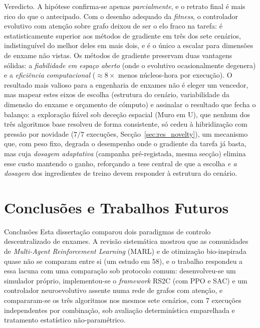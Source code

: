 \documentclass[12pt,reqno, twoside]{amsbook}
\makeatletter
\def\section{\@startsection{section}{1}%
      \z@{.5\linespacing\@plus.7\linespacing}{.25\linespacing}%
      {\normalfont\bfseries\flushleft}}
\def\paragraph{\@startsection{paragraph}{4}%
  \z@\z@{-\fontdimen2\font}%
  {\normalfont\bfseries}}
\theoremstyle{plain}
\numberwithin{equation}{chapter}
\numberwithin{section}{chapter}
\numberwithin{table}{chapter}
\numberwithin{figure}{chapter}
\makeatother
\begin{document}
\paragraph{Veredicto.} A hipótese confirma-se apenas \emph{parcialmente}, e o retrato final é mais rico do que o antecipado. Com o desenho adequado da \textit{fitness}, o controlador evolutivo com atenção sobre grafo deixou de ser o elo fraco na tarefa: é estatisticamente superior aos métodos de gradiente em três dos sete cenários, indistinguível do melhor deles em mais dois, e é o único a escalar para dimensões de enxame não vistas. Os métodos de gradiente preservam duas vantagens sólidas: a \emph{fiabilidade em espaço aberto} (onde o evolutivo ocasionalmente degenera) e a \emph{eficiência computacional} ($\approx 8\times$ menos núcleos-hora por execução). O resultado mais valioso para a engenharia de enxames não é eleger um vencedor, mas mapear estes eixos de escolha (estrutura do cenário, variabilidade da dimensão do enxame e orçamento de cómputo) e assinalar o resultado que fecha o balanço: a exploração fiável sob deceção espacial (Muro em U), que nenhum dos três algoritmos base resolveu de forma consistente, só cedeu à hibridização com pressão por novidade ($7/7$ execuções, Secção~\ref{sec:res_novelty}), um mecanismo que, com peso fixo, degrada o desempenho onde o gradiente da tarefa já basta, mas cuja \emph{dosagem adaptativa} (campanha pré-registada, mesma secção) elimina esse custo mantendo o ganho, reforçando a tese central de que a escolha \emph{e a dosagem} dos ingredientes de treino devem responder à estrutura do cenário.

\chapter{Conclusões e Trabalhos Futuros}
\label{ch:conclusoes}

\section{Conclusões}
Esta dissertação comparou dois paradigmas de controlo descentralizado de enxames. A revisão sistemática mostrou que as comunidades de \textit{Multi-Agent Reinforcement Learning} (MARL) e de otimização bio-inspirada quase não se comparam entre si (um estudo em 58), e o trabalho respondeu a essa lacuna com uma comparação sob protocolo comum: desenvolveu-se um simulador próprio, implementou-se o \textit{framework} RS2C (com PPO e SAC) e um controlador neuroevolutivo assente numa rede de grafos com atenção, e compararam-se os três algoritmos nos mesmos sete cenários, com 7 execuções independentes por combinação, sob avaliação determinística emparelhada e tratamento estatístico não-paramétrico.
\end{document}
